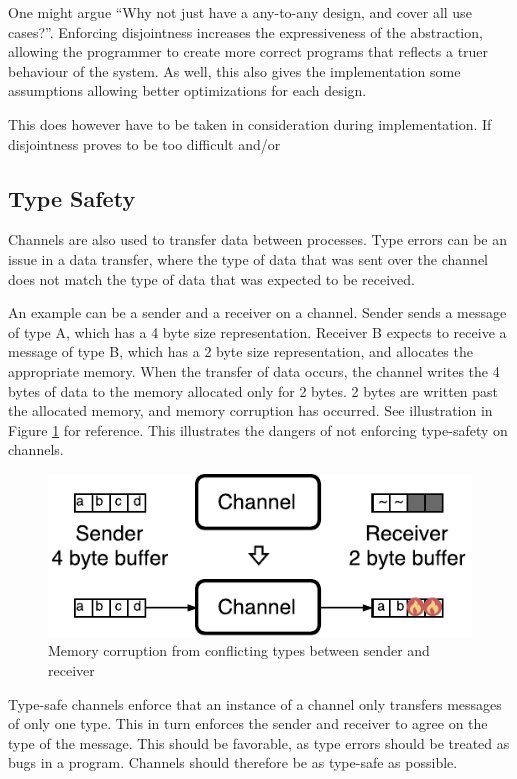 One might argue ``Why not just have a any\hyp{}to\hyp{}any design, and cover all use cases?''. Enforcing disjointness increases the expressiveness of the abstraction, allowing the programmer to create more correct programs that reflects a truer behaviour of the system. As well, this also gives the implementation some assumptions allowing better optimizations for each design. 

This does however have to be taken in consideration during implementation. If disjointness proves to be too difficult and/or 

\subsection{Type Safety}

Channels are also used to transfer data between processes. Type errors can be an issue in a data transfer, where the type of data that was sent over the channel does not match the type of data that was expected to be received. 

An example can be a sender and a receiver on a channel. Sender sends a message of type A, which has a 4 byte size representation. Receiver B expects to receive a message of type B, which has a 2 byte size representation, and allocates the appropriate memory. When the transfer of data occurs, the channel writes the 4 bytes of data to the memory allocated only for 2 bytes. 2 bytes are written past the allocated memory, and memory corruption has occurred. See illustration in Figure \ref{fig:type_error} for reference. This illustrates the dangers of not enforcing type\hyp{}safety on channels. 

\FloatBarrier

\begin{figure}[h]
    \centering
    \includegraphics[width=0.6\linewidth]{fig/type_error}
    \caption{Memory corruption from conflicting types between sender and receiver}
    \label{fig:type_error}
\end{figure}

\FloatBarrier

Type\hyp{}safe channels enforce that an instance of a channel only transfers messages of only one type. This in turn enforces the sender and receiver to agree on the type of the message. This should be favorable, as type errors should be treated as bugs in a program. Channels should therefore be as type\hyp{}safe as possible.

